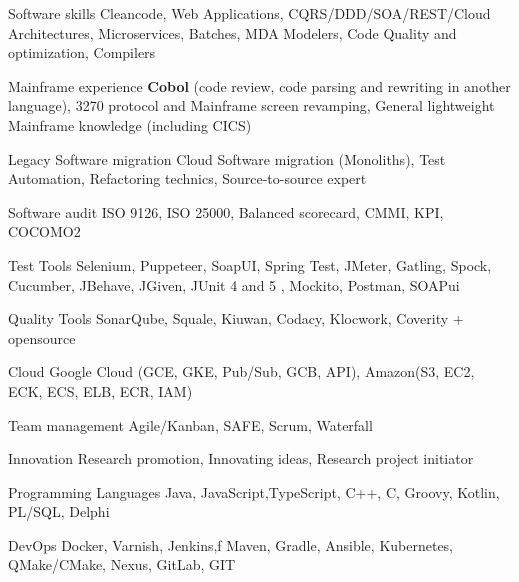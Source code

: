 

\begin{cvskills}

  \cvskill
  {Software skills} %
  {Cleancode, Web Applications, CQRS/DDD/SOA/REST/Cloud Architectures, Microservices, Batches, MDA Modelers, Code Quality and optimization, Compilers} %

  \cvskill
  {Mainframe experience} %
  {\textbf{Cobol} (code review, code parsing and rewriting in another language), 3270 protocol and Mainframe screen revamping, General lightweight Mainframe knowledge (including CICS)} %

  \cvskill
  {Legacy Software migration} %
  {Cloud Software migration (Monoliths), Test Automation, Refactoring technics, Source-to-source expert} %


  \cvskill
  {Software audit} %
  {ISO 9126, ISO 25000, Balanced scorecard, CMMI, KPI, COCOMO2} %

  \cvskill
  {Test Tools} %
  {Selenium, Puppeteer, SoapUI, Spring Test, JMeter, Gatling, Spock, Cucumber, JBehave, JGiven, JUnit 4 and 5 , Mockito, Postman, SOAPui} %

  \cvskill
  {Quality Tools} %
  {SonarQube, Squale, Kiuwan, Codacy, Klocwork, Coverity + opensource} %


  \cvskill
  {Cloud} %
  {Google Cloud (GCE, GKE, Pub/Sub, GCB, API), Amazon(S3, EC2, ECK, ECS, ELB, ECR, IAM)} %


  \cvskill
  {Team management} %
  {Agile/Kanban, SAFE, Scrum, Waterfall} %

  \cvskill
  {Innovation} %
  {Research promotion, Innovating ideas, Research project initiator} %

  \cvskill
  {Programming Languages} %
  {Java, JavaScript,TypeScript, C++, C, Groovy, Kotlin, PL/SQL, Delphi} %
  
  \cvskill
  {DevOps} %
  {Docker, Varnish, Jenkins,f Maven, Gradle, Ansible, Kubernetes, QMake/CMake, Nexus, GitLab, GIT} %
  

\end{cvskills}
